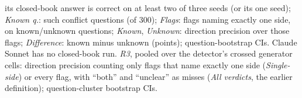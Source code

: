 \begin{table}[t]
{its closed-book answer is correct on at least two of three seeds (or its one seed); \emph{Known q.}: such conflict
questions (of 300); \emph{Flags}: flags naming exactly one side, on known/unknown questions;
\emph{Known}, \emph{Unknown}: direction precision over those flags; \emph{Difference}: known minus unknown (points);
question-bootstrap CIs. Claude Sonnet has no closed-book run. \emph{R3}, pooled over the detector's crossed generator cells: direction precision counting
only flags that name exactly one side (\emph{Single-side}) or every flag, with ``both'' and ``unclear'' as misses
(\emph{All verdicts}, the earlier definition); question-cluster bootstrap CIs.}
\label{tab:prior}
\end{table}
